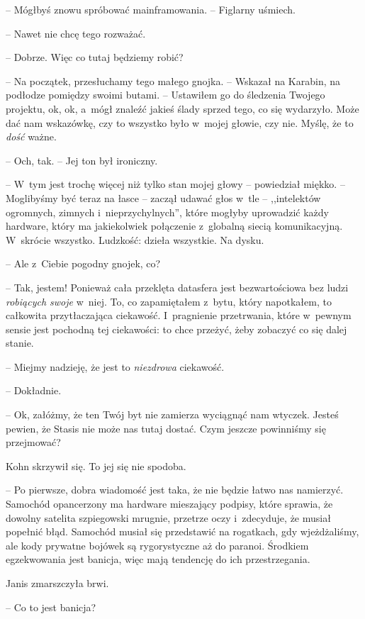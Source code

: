 \documentclass[oneside,polish,11pt,sfheadings]{mwbk}
\begin{document}
-- Mógłbyś znowu spróbować mainframowania. -- Figlarny uśmiech.

-- Nawet nie chcę tego rozważać.

-- Dobrze. Więc co tutaj będziemy robić?

-- Na początek, przesłuchamy tego małego gnojka. -- Wskazał na Karabin, na
podłodze pomiędzy swoimi butami. -- Ustawiłem go do śledzenia Twojego
projektu, ok, ok, a~mógł znaleźć jakieś ślady sprzed tego, co się
wydarzyło. Może dać nam wskazówkę, czy to wszystko było w~mojej głowie,
czy nie. Myślę, że to \emph{dość} ważne.

-- Och, tak. -- Jej ton był ironiczny.

-- W~tym jest trochę więcej niż tylko stan mojej głowy -- powiedział
miękko. -- Moglibyśmy być teraz na łasce -- zaczął udawać głos w~tle -- ,,intelektów ogromnych, zimnych i~nieprzychylnych'', które mogłyby
uprowadzić każdy hardware, który ma jakiekolwiek połączenie z~globalną
siecią komunikacyjną. W~skrócie wszystko. Ludzkość: dzieła wszystkie. Na
dysku.

-- Ale z~Ciebie pogodny gnojek, co?

-- Tak, jestem! Ponieważ cała przeklęta datasfera jest bezwartościowa bez
ludzi \emph{robiących swoje} w~niej. To, co zapamiętałem z~bytu, który
napotkałem, to całkowita przytłaczająca ciekawość. I~pragnienie
przetrwania, które w~pewnym sensie jest pochodną tej ciekawości: to chce
przeżyć, żeby zobaczyć co się dalej stanie.

-- Miejmy nadzieję, że jest to \emph{niezdrowa} ciekawość.

-- Dokładnie.

-- Ok, załóżmy, że ten Twój byt nie zamierza wyciągnąć nam wtyczek.
Jesteś pewien, że Stasis nie może nas tutaj dostać. Czym jeszcze
powinniśmy się przejmować?

Kohn skrzywił się. To jej się nie spodoba.

-- Po pierwsze, dobra wiadomość jest taka, że nie będzie łatwo nas
namierzyć. Samochód opancerzony ma hardware mieszający podpisy, które
sprawia, że dowolny satelita szpiegowski mrugnie, przetrze oczy i~zdecyduje, że musiał popełnić błąd. Samochód musiał się przedstawić na
rogatkach, gdy wjeżdżaliśmy, ale kody prywatne bojówek są rygorystyczne
aż do paranoi. Środkiem egzekwowania jest banicja, więc mają tendencję
do ich przestrzegania.

Janis zmarszczyła brwi. 

-- Co to jest banicja?
\end{document}
